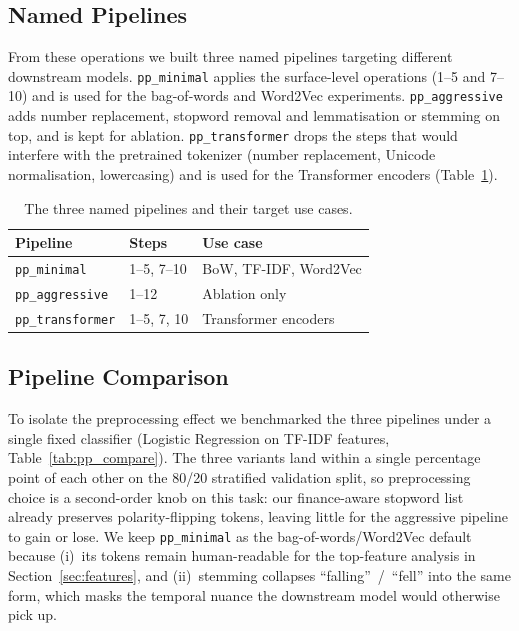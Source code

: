 \documentclass[12pt,a4paper]{article}
\begin{document}
\subsection{Named Pipelines}

From these operations we built three named pipelines targeting different downstream models. \texttt{pp\_minimal} applies the surface-level operations (1--5 and 7--10) and is used for the bag-of-words and Word2Vec experiments. \texttt{pp\_aggressive} adds number replacement, stopword removal and lemmatisation or stemming on top, and is kept for ablation. \texttt{pp\_transformer} drops the steps that would interfere with the pretrained tokenizer (number replacement, Unicode normalisation, lowercasing) and is used for the Transformer encoders (Table~\ref{tab:pipelines}).

\begin{table}[!htbp]
\centering
\begin{tabular}{llp{6cm}}
\toprule
\textbf{Pipeline} & \textbf{Steps} & \textbf{Use case} \\
\midrule
\texttt{pp\_minimal}     & 1--5, 7--10 & BoW, TF-IDF, Word2Vec \\
\texttt{pp\_aggressive}  & 1--12       & Ablation only \\
\texttt{pp\_transformer} & 1--5, 7, 10 & Transformer encoders \\
\bottomrule
\end{tabular}
\caption{The three named pipelines and their target use cases.}
\label{tab:pipelines}
\end{table}

\subsection{Pipeline Comparison}

To isolate the preprocessing effect we benchmarked the three pipelines under a single fixed classifier (Logistic Regression on TF-IDF features, Table~\ref{tab:pp_compare}). The three variants land within a single percentage point of each other on the 80/20 stratified validation split, so preprocessing choice is a second-order knob on this task: our finance-aware stopword list already preserves polarity-flipping tokens, leaving little for the aggressive pipeline to gain or lose. We keep \texttt{pp\_minimal} as the bag-of-words/Word2Vec default because (i)~its tokens remain human-readable for the top-feature analysis in Section~\ref{sec:features}, and (ii)~stemming collapses ``falling''~/~``fell'' into the same form, which masks the temporal nuance the downstream model would otherwise pick up.
\end{document}
